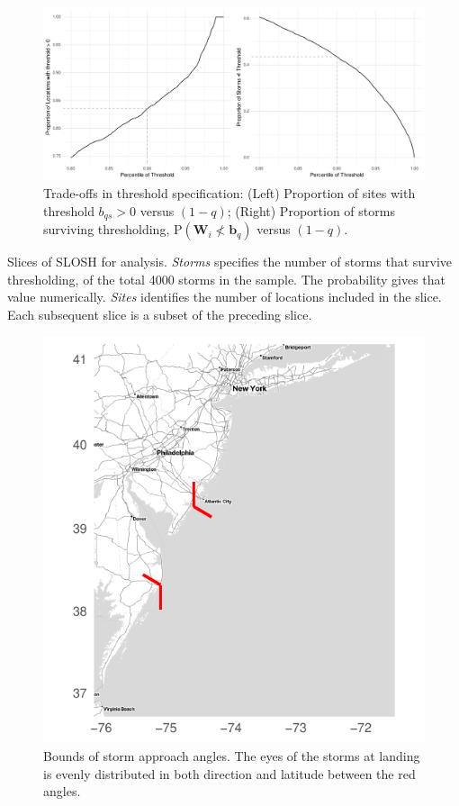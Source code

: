 \begin{figure}[ht]
    \centering
    \caption{Trade-offs in threshold specification:
    (Left) Proportion of sites with threshold $b_{qs} > 0$ versus $(1 - q)$; 
    (Right) Proportion of storms surviving thresholding, $\text{P}(\bm{W}_i \not< \bm{b}_q)$ versus $(1 - q)$.
    \label{fig:thresholdselection}}
    \includegraphics[width=0.7\linewidth]{plots/explore_threshold}
\end{figure}

\begin{table}[htb]
    \centering
    \caption{Slices of SLOSH for analysis.  \emph{Storms} specifies the number of storms that survive 
    thresholding, of the total \num{4000} storms in the sample.  The probability gives that value 
    numerically. \emph{Sites} identifies the number of locations included in the slice. Each 
    subsequent slice is a subset of the preceding slice.\label{tab:datasets}}
    
\end{table}

\begin{figure}[htb]
    \centering
    \caption{Bounds of storm approach angles.  The eyes of the storms at landing is evenly distributed 
        in both direction and latitude between the red angles.\label{fig:slosh_bounds}}
    \includegraphics{plots/slosh_bounds}
\end{figure}

